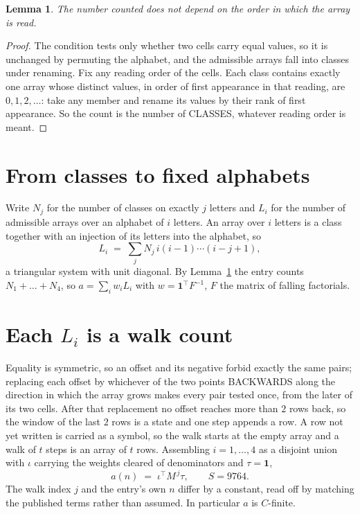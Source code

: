 \documentclass[11pt,a4paper]{article}
\theoremstyle{plain}
\newtheorem{lemma}[theorem]{Lemma}
\theoremstyle{definition}
\begin{document}
\begin{lemma}\label{lem:order}
The number counted does not depend on the order in which the array is read.
\end{lemma}

\begin{proof}
The condition tests only whether two cells carry equal values, so it is unchanged by permuting
the alphabet, and the admissible arrays fall into classes under renaming. Fix any reading order
of the cells. Each class contains exactly one array whose distinct values, in order of first
appearance in that reading, are $0,1,2,\dots$: take any member and rename its values by their
rank of first appearance. So the count is the number of CLASSES, whatever reading order is
meant.
\end{proof}

\section{From classes to fixed alphabets}

Write $N_j$ for the number of classes on exactly $j$ letters and $L_i$ for the number of
admissible arrays over an alphabet of $i$ letters. An array over $i$ letters is a class together
with an injection of its letters into the alphabet, so
\[
L_i\;=\;\sum_j N_j\,i(i-1)\cdots(i-j+1),
\]
a triangular system with unit diagonal. By Lemma~\ref{lem:order} the entry counts
$N_1+\dots+N_{4}$, so $a=\sum_i w_iL_i$ with $w=\mathbf{1}^{\!\top}F^{-1}$, $F$ the
matrix of falling factorials.

\section{Each $L_i$ is a walk count}

Equality is symmetric, so an offset and its negative forbid exactly the same pairs; replacing
each offset by whichever of the two points BACKWARDS along the direction in which the array
grows makes every pair tested once, from the later of its two cells. After that replacement no
offset reaches more than $2$ rows back, so the window of the last $2$
rows is a state and one step appends a row. A row not yet written is
carried as a symbol, so the walk starts at the empty array and a walk of $t$ steps is an array
of $t$ rows. Assembling $i=1,\dots,4$ as a disjoint union with $\iota$ carrying the
weights cleared of denominators and $\tau=\mathbf{1}$,
\[
a(n)\;=\;\iota^{\!\top}M^{\,j}\tau ,\qquad S=9764.
\]
The walk index $j$ and the entry's own $n$ differ by a constant, read off by matching the
published terms rather than assumed. In particular $a$ is $C$-finite.
\end{document}
